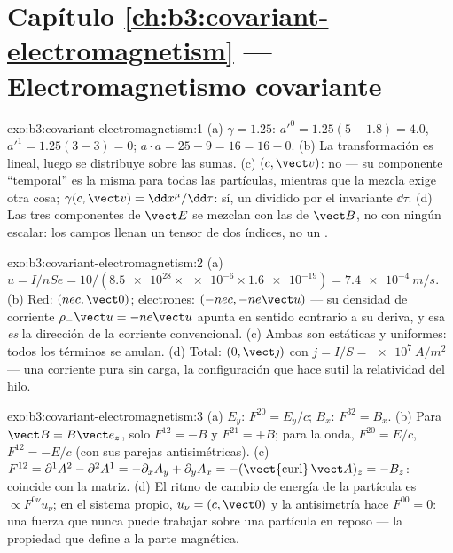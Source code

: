 \section*{Capítulo \ref{ch:b3:covariant-electromagnetism} --- Electromagnetismo covariante}

\begin{solution}{exo:b3:covariant-electromagnetism:1}
(a) $\gamma = 1.25$: $a'^0 = 1.25(5 - 1.8) = 4.0$, $a'^1 = 1.25(3 -
3) = 0$; $a\cdot a = 25 - 9 = 16 = 16 - 0$. (b) La transformación es
lineal, luego se distribuye sobre las sumas. (c) $(c, \vect v)$: no --- su
componente ``temporal'' es la misma para todas las partículas, mientras que
la mezcla exige otra cosa; $\gamma(c, \vect v) = \dd x^\mu/\dd\tau$: sí, un
 dividido por el invariante $\dd\tau$. (d) Las tres componentes
de $\vect E$ se mezclan con las de $\vect B$, no con ningún escalar: los
campos llenan un tensor de dos índices, no un .
\end{solution}

\begin{solution}{exo:b3:covariant-electromagnetism:2}
(a) $u = I/nSe = 10/(\num{8.5e28} \times \num{e-6} \times
\num{1.6e-19}) = \qty{7.4e-4}{m/s}$. (b) Red: $(nec, \vect 0)$;
electrones: $(-nec, -ne\vect u)$ --- su densidad de corriente
$\rho_-\vect u = -ne\vect u$ apunta en sentido contrario a su deriva, y esa
\emph{es} la dirección de la corriente convencional. (c) Ambas son estáticas y uniformes: todos los términos se anulan. (d)
Total: $(0, \vect\jmath)$ con $j = I/S = \qty{e7}{A/m^2}$ --- una
corriente pura sin carga, la configuración que hace sutil la relatividad
del hilo.
\end{solution}

\begin{solution}{exo:b3:covariant-electromagnetism:3}
(a) $E_y$: $F^{20} = E_y/c$; $B_x$: $F^{32} = B_x$. (b) Para $\vect B
= B\vect e_z$, solo $F^{12} = -B$ y $F^{21} = +B$; para la onda,
$F^{20} = E/c$, $F^{12} = -E/c$ (con sus parejas antisimétricas). (c)
$F^{12} = \partial^1A^2 - \partial^2A^1 = -\partial_xA_y +
\partial_yA_x = -(\operatorname{\vect{curl}}\vect A)_z = -B_z$:
coincide con la matriz. (d) El ritmo de cambio de energía de la partícula es
$\propto F^{0\nu}u_\nu$; en el sistema propio, $u_\nu = (c, \vect 0)$ y la
antisimetría hace $F^{00} = 0$: una fuerza que nunca puede trabajar sobre
una partícula en reposo --- la propiedad que define a la parte magnética.
\end{solution}


